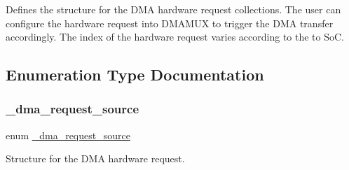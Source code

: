 Defines the structure for the D\+MA hardware request collections. The user can configure the hardware request into D\+M\+A\+M\+UX to trigger the D\+MA transfer accordingly. The index of the hardware request varies according to the to SoC. 

\subsection{Enumeration Type Documentation}
\mbox{\label{group__edma__request_gafd16b7227cfdebb996c941d293ddd600}} 
\subsubsection{\texorpdfstring{\_dma\_request\_source}{\_dma\_request\_source}}
{\footnotesize\ttfamily enum \mbox{\hyperlink{group__edma__request_gafd16b7227cfdebb996c941d293ddd600}{\+\_\+dma\+\_\+request\+\_\+source}}}



Structure for the D\+MA hardware request. 

